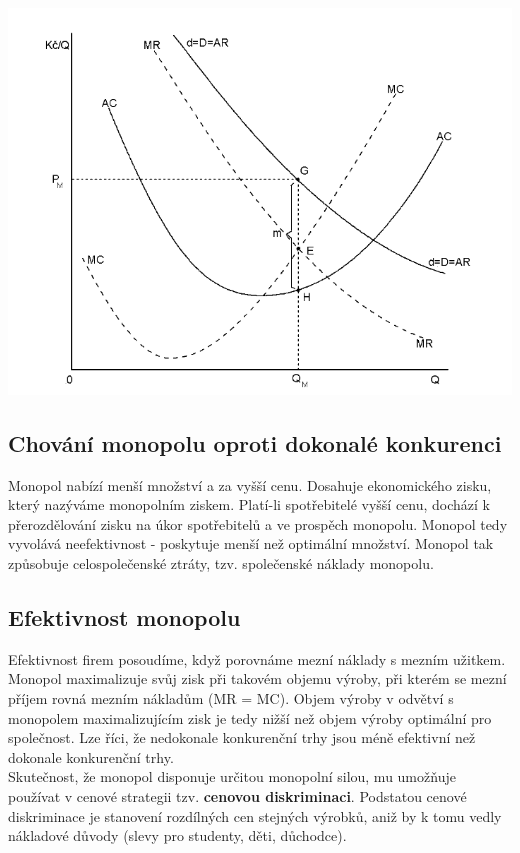 \includegraphics[width=16cm]{images/13_rovnovaha.png}

\subsection{Chování monopolu oproti dokonalé konkurenci}
Monopol nabízí menší množství a za vyšší cenu. Dosahuje ekonomického zisku, který nazýváme
monopolním ziskem. Platí-li spotřebitelé vyšší cenu, dochází k přerozdělování zisku na úkor 
spotřebitelů a ve prospěch monopolu. Monopol tedy vyvolává neefektivnost - poskytuje menší 
než optimální množství. Monopol tak způsobuje celospolečenské ztráty, tzv. společenské náklady monopolu.

\subsection{Efektivnost monopolu}
Efektivnost firem posoudíme, když porovnáme mezní náklady s mezním užitkem. Monopol
maximalizuje svůj zisk při takovém objemu výroby, při kterém se mezní příjem rovná
mezním nákladům (MR = MC). Objem výroby v odvětví s monopolem maximalizujícím zisk je tedy
nižší než objem výroby optimální pro společnost. Lze říci, že nedokonale konkurenční trhy jsou méně
efektivní než dokonale konkurenční trhy.\\
Skutečnost, že monopol disponuje určitou monopolní silou, mu umožňuje používat v cenové
strategii tzv. \textbf{cenovou diskriminaci}. Podstatou cenové diskriminace je stanovení rozdílných
cen stejných výrobků, aniž by k tomu vedly nákladové důvody (slevy pro studenty, děti, důchodce).

